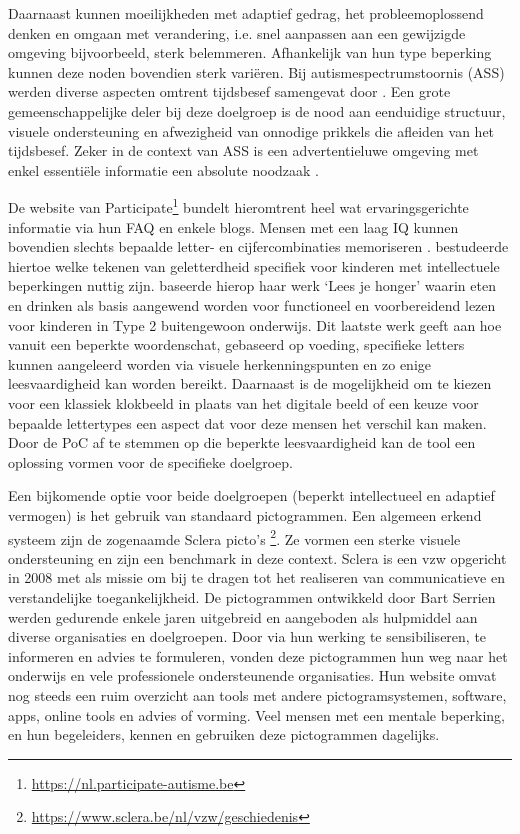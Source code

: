 Daarnaast kunnen moeilijkheden met adaptief gedrag, het probleemoplossend denken en omgaan met verandering, i.e. snel aanpassen aan een gewijzigde omgeving bijvoorbeeld, sterk belemmeren. Afhankelijk van hun type beperking kunnen deze noden bovendien sterk variëren. Bij autismespectrumstoornis (ASS) werden diverse aspecten omtrent tijdsbesef samengevat door \textcite{Degrieck2014}. Een grote gemeenschappelijke deler bij deze doelgroep is de nood aan eenduidige structuur, visuele ondersteuning en afwezigheid van onnodige prikkels die afleiden van het tijdsbesef. Zeker in de context van ASS is een advertentieluwe omgeving met enkel essentiële informatie een absolute noodzaak \autocite{Roeyers2014}. 

De website van Participate\footnote{\url{https://nl.participate-autisme.be}} bundelt hieromtrent heel wat ervaringsgerichte informatie via hun FAQ en enkele blogs. Mensen met een laag IQ kunnen bovendien slechts bepaalde letter- en cijfercombinaties memoriseren \autocite{DeGraaf2001, Tytgat2014}. \textcite{Tilborg2018} bestudeerde hiertoe welke tekenen van geletterdheid specifiek voor kinderen met intellectuele beperkingen nuttig zijn. \textcite{Uyttersprot2021} baseerde hierop haar werk `Lees je honger' waarin eten en drinken als basis aangewend worden voor functioneel en voorbereidend lezen voor kinderen in Type 2 buitengewoon onderwijs. Dit laatste werk geeft aan hoe vanuit een beperkte woordenschat, gebaseerd op voeding, specifieke letters kunnen aangeleerd worden via visuele herkenningspunten en zo enige leesvaardigheid kan worden bereikt. Daarnaast is de mogelijkheid om te kiezen voor een klassiek klokbeeld in plaats van het digitale beeld of een keuze voor bepaalde lettertypes een aspect dat voor deze mensen het verschil kan maken. Door de PoC af te stemmen op die beperkte leesvaardigheid kan de tool een oplossing vormen voor de specifieke doelgroep. 

Een bijkomende optie voor beide doelgroepen (beperkt intellectueel en adaptief vermogen) is het gebruik van standaard pictogrammen. Een algemeen erkend systeem zijn de zogenaamde Sclera picto's \footnote{\url{https://www.sclera.be/nl/vzw/geschiedenis}}. Ze vormen een sterke visuele ondersteuning en zijn een benchmark in deze context. Sclera is een vzw opgericht in 2008 met als missie om bij te dragen tot het realiseren van communicatieve en verstandelijke toegankelijkheid. De pictogrammen ontwikkeld door Bart Serrien werden gedurende enkele jaren uitgebreid en aangeboden als hulpmiddel aan diverse organisaties en doelgroepen. Door via hun werking te sensibiliseren, te informeren en advies te formuleren, vonden deze pictogrammen hun weg naar het onderwijs en vele professionele ondersteunende organisaties. Hun website omvat nog steeds een ruim overzicht aan tools met andere pictogramsystemen, software, apps, online tools en advies of vorming. Veel mensen met een mentale beperking, en hun begeleiders, kennen en gebruiken deze pictogrammen dagelijks. 

